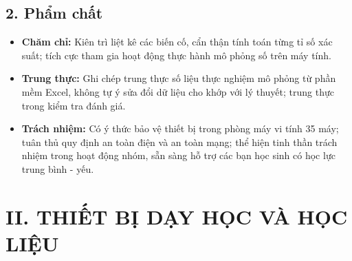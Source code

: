 \documentclass[12pt, a4paper]{article}
\begin{document}
\subsection*{2. Phẩm chất}

\begin{itemize}[leftmargin=1.2cm]
    \item \textbf{Chăm chỉ:} Kiên trì liệt kê các biến cố, cẩn thận tính toán từng tỉ số xác suất; tích cực tham gia hoạt động thực hành mô phỏng số trên máy tính.
    \item \textbf{Trung thực:} Ghi chép trung thực số liệu thực nghiệm mô phỏng từ phần mềm Excel, không tự ý sửa đổi dữ liệu cho khớp với lý thuyết; trung thực trong kiểm tra đánh giá.
    \item \textbf{Trách nhiệm:} Có ý thức bảo vệ thiết bị trong phòng máy vi tính 35 máy; tuân thủ quy định an toàn điện và an toàn mạng; thể hiện tinh thần trách nhiệm trong hoạt động nhóm, sẵn sàng hỗ trợ các bạn học sinh có học lực trung bình - yếu.
\end{itemize}

\section*{II. THIẾT BỊ DẠY HỌC VÀ HỌC LIỆU}
\end{document}
